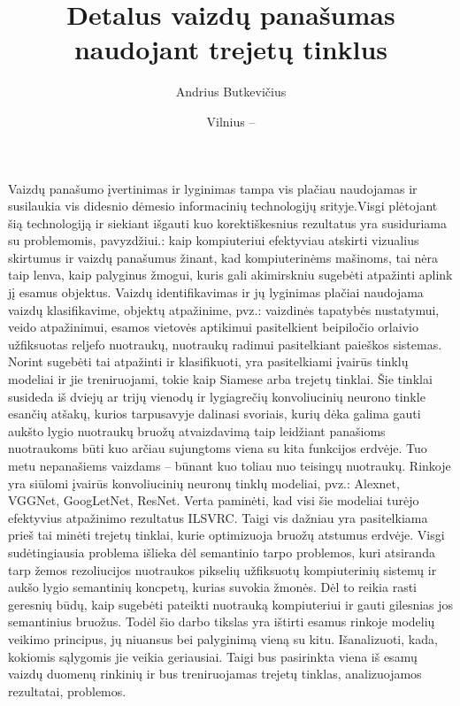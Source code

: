 \documentclass{VUMIFPSkursinis}
\title{Detalus vaizdų panašumas naudojant trejetų tinklus}
\author{Andrius Butkevičius}
\date{Vilnius – \the\year }
\begin{document}
\maketitle
\thispagestyle{empty} 

\tableofcontents



\thispagestyle{empty} 
Vaizdų panašumo įvertinimas ir lyginimas tampa vis plačiau naudojamas ir susilaukia vis didesnio dėmesio informacinių technologijų srityje.Visgi plėtojant šią technologiją ir siekiant išgauti kuo korektiškesnius rezultatus yra susiduriama su problemomis, pavyzdžiui.: kaip kompiuteriui efektyviau atskirti vizualius skirtumus ir vaizdų panašumus žinant, kad kompiuterinėms mašinoms, tai nėra taip lenva, kaip palyginus žmogui, kuris gali akimirskniu sugebėti atpažinti aplink jį esamus objektus. Vaizdų identifikavimas ir jų lyginimas plačiai naudojama vaizdų klasifikavime, objektų atpažinime, pvz.: vaizdinės tapatybės nustatymui, veido atpažinimui, esamos vietovės aptikimui pasitelkient beipiločio orlaivio užfiksuotas reljefo nuotraukų, nuotraukų radimui pasitelkiant paieškos sistemas. Norint sugebėti tai atpažinti ir klasifikuoti, yra pasitelkiami įvairūs tinklų modeliai ir jie treniruojami, tokie kaip Siamese arba trejetų tinklai. Šie tinklai susideda iš dviejų ar trijų vienodų ir lygiagrečių konvoliucinių neurono tinkle esančių atšakų, kurios tarpusavyje dalinasi svoriais, kurių dėka galima gauti aukšto lygio nuotraukų bruožų atvaizdavimą taip leidžiant panašioms nuotraukoms būti kuo arčiau sujungtoms viena su kita funkcijos erdvėje. Tuo metu nepanašiems vaizdams – būnant kuo toliau nuo teisingų nuotraukų. Rinkoje yra siūlomi įvairūs konvoliucinių neuronų tinklų modeliai, pvz.: Alexnet, VGGNet, GoogLetNet, ResNet. Verta paminėti, kad visi šie modeliai turėjo efektyvius atpažinimo rezultatus ILSVRC. Taigi vis dažniau yra pasitelkiama prieš tai minėti trejetų tinklai, kurie optimizuoja bruožų atstumus erdvėje. Visgi sudėtingiausia problema išlieka dėl semantinio tarpo problemos, kuri atsiranda tarp žemos rezoliucijos nuotraukos pikselių užfiksuotų kompiuterinių sistemų ir aukšo lygio semantinių koncpetų, kurias suvokia žmonės. Dėl to reikia rasti geresnių būdų, kaip sugebėti pateikti nuotrauką kompiuteriui ir gauti gilesnias jos semantinius bruožus. Todėl šio darbo tikslas yra ištirti esamus rinkoje modelių veikimo principus, jų niuansus bei palyginimą vieną su kitu. Išanalizuoti, kada, kokiomis sąlygomis jie veikia geriausiai. Taigi bus pasirinkta viena iš esamų vaizdų duomenų rinkinių ir bus treniruojamas trejetų tinklas, analizuojamos rezultatai, problemos.
\end{document}
